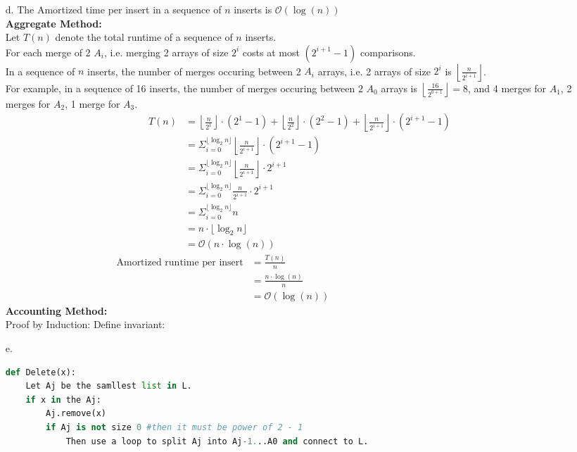 \documentclass[10pt]{article}
\begin{document}
\begin{itemize}
\item[d.]The Amortized time per insert in a sequence of $n$ inserts is $\mathcal{O}(\log(n))$\\
\textbf{Aggregate Method:}\\
Let $T(n)$ denote the total runtime of a sequence of $n$ inserts.\\
For each merge of 2 $A_i$, i.e. merging 2 arrays of size $2^i$ costs at most $(2^{i+1}-1)$ comparisons.\\
In a sequence of $n$ inserts, the number of merges occuring between 2 $A_i$ arrays, i.e. 2 arrays of size $2^i$ is $\left\lfloor\frac{n}{2^{i+1}}\right\rfloor$.\\
For example, in a sequence of 16 inserts, the number of merges occuring between 2 $A_0$ arrays is $\left\lfloor\frac{16}{2^{0+1}}\right\rfloor = 8$, and 4 merges for $A_1$, 2 merges for $A_2$, 1 merge for $A_3$.
\begin{align*}
T(n) &= \left\lfloor\frac{n}{2^1}\right\rfloor\cdot(2^1-1)+\left\lfloor\frac{n}{2^2}\right\rfloor\cdot(2^2-1)+\left\lfloor\frac{n}{2^{i+1}}\right\rfloor\cdot(2^{i+1}-1)\\
&=\Sigma^{\lfloor\log_2n\rfloor}_{i=0}\left\lfloor\frac{n}{2^{i+1}}\right\rfloor\cdot(2^{i+1}-1)\\
&=\Sigma^{\lfloor\log_2n\rfloor}_{i=0}\left\lfloor\frac{n}{2^{i+1}}\right\rfloor\cdot2^{i+1}\\
&=\Sigma^{\lfloor\log_2n\rfloor}_{i=0}\frac{n}{2^{i+1}}\cdot2^{i+1}\\
&=\Sigma^{\lfloor\log_2n\rfloor}_{i=0}n\\
&=n\cdot\lfloor\log_2n\rfloor\\
&=\mathcal{O}(n\cdot\log(n))
\end{align*}
\begin{align*}
\text{Amortized runtime per insert}&=\frac{T(n)}{n}\hspace{20em}\\
&=\frac{n\cdot\log(n)}{n}\\
&=\mathcal{O}(\log(n))
\end{align*}
\textbf{Accounting Method:}\\
Proof by Induction:
Define invariant: \\
\item[e.]
\begin{lstlisting}[language=Python]
def Delete(x):
	Let Aj be the samllest list in L.
	if x in the Aj:
		Aj.remove(x)
		if Aj is not size 0 #then it must be power of 2 - 1
			Then use a loop to split Aj into Aj-1...A0 and connect to L.

\end{lstlisting}
\end{itemize}
\end{document}
